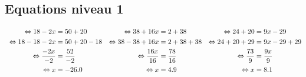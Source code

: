 \documentclass{article}%
\begin{document}
\subsection*{Equations niveau 1}%
\label{subsec:Equationsniveau1}%
\begin{align*}%
\  \Leftrightarrow 18 - 2x &= 50 + 20     & \Leftrightarrow 38 + 16x  &= 2 + 38       & \Leftrightarrow 24 + 20 &= 9x - 29\\%
\vspace{5mm}%
\newline%
\  \Leftrightarrow 18 - 18 - 2x &= 50 + 20 -18      & \Leftrightarrow 38 - 38 + 16x  &= 2 + 38 + 38        & \Leftrightarrow 24 + 20 + 29 &= 9x - 29 +29\\%
\vspace{5mm}%
\newline%
\  \Leftrightarrow \frac{-2x}{-2} &= \frac{52}{-2}      & \Leftrightarrow \frac{16x}{16} &= \frac{78}{16}      & \Leftrightarrow \frac{73}{9} &= \frac{9x}{9}\\%
\vspace{5mm}%
\newline%
\  \Leftrightarrow  x &= -26.0      & \Leftrightarrow  x &= 4.9      & \Leftrightarrow  x &= 8.1\\%
\end{align*}

%
\end{document}
